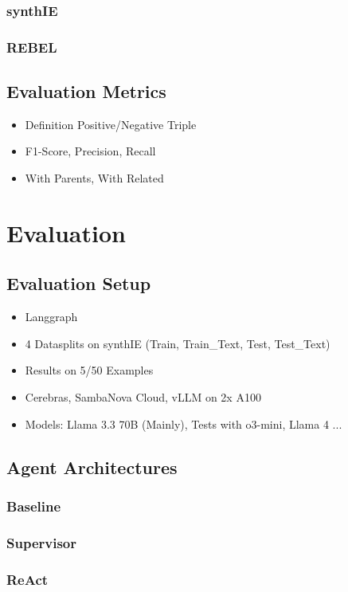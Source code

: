 \documentclass[a4paper,oneside,bibliography=totoc]{scrbook}
\begin{document}
\subsection{synthIE}
\subsection{REBEL}
\section{Evaluation Metrics}
\begin{itemize}
  \item Definition Positive/Negative Triple \cite{Josifoski2021}
  \item F1-Score, Precision, Recall
  \item With Parents, With Related
\end{itemize}


\chapter{Evaluation}
\section{Evaluation Setup}
\begin{itemize}
  \item Langgraph
  \item 4 Datasplits on synthIE (Train, Train\_Text, Test, Test\_Text)
  \item Results on 5/50 Examples
  \item Cerebras, SambaNova Cloud, vLLM on 2x A100
  \item Models: Llama 3.3 70B (Mainly), Tests with o3-mini, Llama 4 ...
\end{itemize}
\section{Agent Architectures}
\subsection{Baseline}
\subsection{Supervisor}
\subsection{ReAct}
\end{document}

